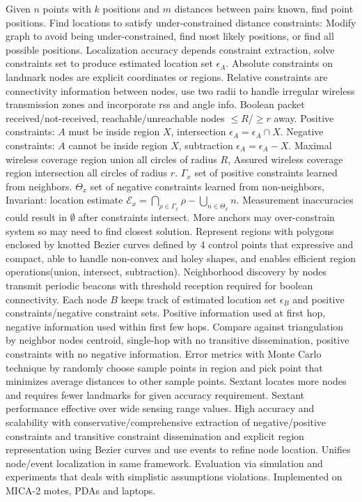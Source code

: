 \documentclass[9pt]{extarticle}
\begin{document}
\begin{multicols}{2}
Given $n$ points with $k$ positions and $m$ distances between pairs known, find point positions. Find locations to satisfy under-constrained distance constraints: Modify graph to avoid being under-constrained, find most likely positions, or find all possible positions. Localization accuracy depends constraint extraction, solve constraints set to produce estimated location set $\epsilon_A$. Absolute constraints on landmark nodes are explicit coordinates or regions. Relative constraints are connectivity information between nodes, use two radii to handle irregular wireless transmission zones and incorporate rss and angle info. Boolean packet received/not-received, reachable/unreachable nodes $\leq{R}$/$\geq{r}$ away. Positive constraints: $A$ must be inside region $X$, intersection $\epsilon_A = \epsilon_A\cap{X}$. Negative constraints: $A$ cannot be inside region $X$, subtraction $\epsilon_A = \epsilon_A-X$. Maximal wireless coverage region union all circles of radius $R$, Assured wireless coverage region intersection all circles of radius $r$. $\Gamma_x$ set of positive constraints learned from neighbors. $\Theta_x$ set of negative constraints learned from non-neighbors, Invariant: location estimate $\mathcal{E}_x= \bigcap_{\rho\in\Gamma_x}\rho-\bigcup_{n\in\Theta_x}n$. Measurement inaccuracies could result in $\emptyset$ after constraints intersect. More anchors may over-constrain system so may need to find closest solution. Represent regions with polygons enclosed by knotted Bezier curves defined by 4 control points that expressive and compact, able to handle non-convex and holey shapes, and enables efficient region operations(union, intersect, subtraction). Neighborhood discovery by nodes transmit periodic beacons with threshold reception required for boolean connectivity. Each node $B$ keeps track of estimated location set $\epsilon_B$ and positive constraints/negative constraint sets.  Positive information used at first hop, negative information used within first few hops. Compare against triangulation by neighbor nodes centroid, single-hop with no transitive dissemination, positive constraints with no negative information. Error metrics with Monte Carlo technique by randomly choose sample points in region and pick point that minimizes average distances to other sample points. Sextant locates more nodes and requires fewer landmarks for given accuracy requirement. Sextant performance effective over wide sensing range values. High accuracy and scalability with conservative/comprehensive extraction of negative/positive constraints and transitive constraint dissemination and explicit region representation using Bezier curves and use events to refine node location. Unifies node/event localization in same framework. Evaluation via simulation and experiments that deals with simplistic assumptions violations. Implemented on MICA-2 motes, PDAs and laptops.


\end{multicols}
\end{document}
